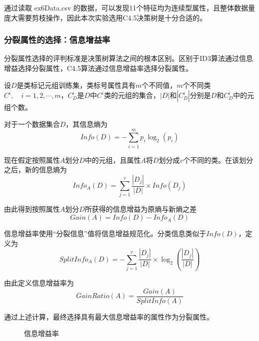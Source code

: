 \documentclass{sdureport}
\begin{document}
\begin{sduDocument}
	通过读取 ex6Data.csv 的数据，可以发现11个特征均为连续型属性，且整体数据量庞大需要剪枝操作，因此本次实验选用C4.5决策树是十分合适的。

	\subsubsection{分裂属性的选择：信息增益率}

	分裂属性选择的评判标准是决策树算法之间的根本区别。区别于ID3算法通过信息增益选择分裂属性，C4.5算法通过信息增益率选择分裂属性。

	设$D$是类标记元组训练集，类标号属性具有$m$个不同值，$m$个不同类$C^i,\quad i=1,2,\cdots,m$，$C^i_D$是$D$中$C^i$类的元组的集合，$|D|$和$|C^i_D|$分别是$D$和$C^i_D$中的元组个数。

	对于一个数据集合$D$，其信息熵为\[Info(D)=-\sum_{i=1}^{m}p_i\log_2(p_i)\]

	现在假定按照属性$A$划分$D$中的元组，且属性$A$将$D$划分成$v$个不同的类。在该划分之后，新的信息熵为\[Info_A(D)=\sum_{j=1}^{v}\frac{|D_j|}{|D|}\times Info(D_j)\]

	由此得到按照属性$A$划分$D$所获得的信息增益为原熵与新熵之差\[Gain(A)=Info(D)-Info_A(D)\]
	
	信息增益率使用“分裂信息”值将信息增益规范化。分类信息类似于$Info(D)$，定义为\[SplitInfo_A(D)=-\sum_{j=1}^{v}\frac{|D_j|}{|D|}\times \log_2(\frac{|D_j|}{|D|})\]

	由此定义信息增益率为\[GainRatio(A)=\frac{Gain(A)}{SplitInfo(A)}\]

	通过上述计算，最终选择具有最大信息增益率的属性作为分裂属性。

	\begin{figure}[H]
		\caption{信息增益率}
	\end{figure}


\end{sduDocument}
\end{document}
